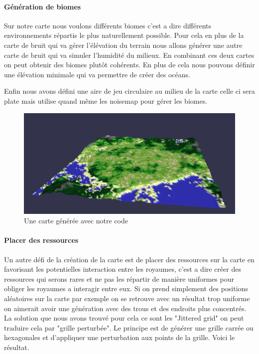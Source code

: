     \paragraph{Génération de biomes}
    Sur notre carte nous voulons différents biomes c'est a dire différents environnements répartis le plus naturellement possible. Pour cela en plus de la carte de bruit qui va gérer l'élévation du terrain nous allons générer une autre carte de bruit qui va simuler l’humidité du milieux. En combinant ces deux cartes on peut obtenir des biomes plutôt cohérents. En plus de cela nous pouvons définir une élévation minimale qui va permettre de créer des océans.

    Enfin nous avons défini une aire de jeu circulaire au milieu de la carte celle ci sera plate mais utilise quand même les noisemap pour gérer les biomes.


    \begin{figure}[!h]
        \centering
        \includegraphics[width=0.5\linewidth]{images/map.png}
        \caption{Une carte générée avec notre code}
        \label{fig:enter-label}
    \end{figure}

    \paragraph{Placer des ressources}
    Un autre défi de la création de la carte est de placer des ressources sur la carte en favorisant les potentielles interaction entre les royaumes, c'est a dire créer des ressources qui serons rares et ne pas les répartir de manière uniformes pour obliger les royaumes a interagir entre eux. Si on prend simplement des positions aléatoires sur la carte par exemple on se retrouve avec un résultat trop uniforme on aimerait avoir une génération avec des trous et des endroits plus concentrés. La solution que nous avons trouvé pour cela ce sont les "Jittered grid"\cite{JitteredGrid} on peut traduire cela par "grille perturbée". Le principe est de générer une grille carrée ou hexagonales et d'appliquer une perturbation aux points de la grille. Voici le résultat.

